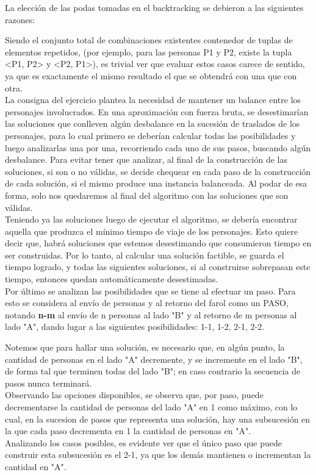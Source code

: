 La elección de las podas tomadas en el backtracking se debieron a las siguientes razones:

Siendo el conjunto total de combinaciones existentes contenedor de tuplas de elementos repetidos, (por ejemplo, para las personas P1 y P2, existe la tupla <P1, P2> y <P2, P1>), es trivial ver que evaluar estos casos carece de sentido, ya que es exactamente el mismo resultado el que se obtendr\'a con una que con otra.\\

La consigna del ejercicio plantea la necesidad de mantener un balance entre los personajes involucrados. En una aproximación con fuerza bruta, se desestimarían las soluciones que conlleven alg\'un desbalance en la sucesi\'on de traslados de los personajes, para lo cual primero se deberían calcular todas las posibilidades y luego analizarlas una por una, recorriendo cada uno de sus pasos, buscando alg\'un desbalance. Para evitar tener que analizar, al final de la construcci\'on de las soluciones, si son o no válidas, se decide chequear en cada paso de la construcci\'on de cada solución, si el mismo produce una instancia balanceada. Al podar de esa forma, solo nos quedaremos al final del algoritmo con las soluciones que son v\'alidas.\\

Teniendo ya las soluciones luego de ejecutar el algoritmo, se debería encontrar aquella que produzca el mínimo tiempo de viaje de los personajes. Esto quiere decir que, habrá soluciones que estemos desestimando que consumieron tiempo en ser construidas. 
Por lo tanto, al calcular una soluci\'on factible, se guarda el tiempo logrado, y todas las siguientes soluciones, si al construirse sobrepasan este tiempo, entonces quedan automáticamente desestimadas.\\

Por \'ultimo se analizan las posibilidades que se tiene al efectuar un paso. Para esto se considera al env\'io de personas y al retorno del farol como un PASO, notando \textbf{n-m} al env\'io de n personas al lado "B" y al retorno de m personas al lado "A", dando lugar a las siguientes posibilidades: {1-1, 1-2, 2-1, 2-2}.

Notemos que para hallar una solución, es necesario que, en alg\'un punto, la cantidad de personas en el lado "A" decremente, y se incremente en el lado "B", de forma tal que terminen todas del lado "B"; en caso contrario la secuencia de pasos nunca terminará.\\ Observando las opciones disponibles, se observa que, por paso, puede decrementarse la cantidad de personas del lado "A" en 1 como máximo, con lo cual, en la sucesion de pasos que representa una solución, hay una subsucesi\'on en la que cada paso decrementa en 1 la cantidad de personas en "A".\\ Analizando los casos posibles, es evidente ver que el único paso que puede construir esta subsucesión es el 2-1, ya que los demás mantienen o incrementan la cantidad en "A".\\\\

